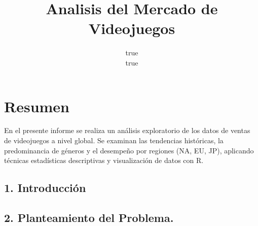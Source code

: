 \documentclass[oneside,11pt]{Latex/Classes/PhDthesisPSnPDF}
\title{Analisis del Mercado de Videojuegos}
\author{true \\ true}
\begin{document}
\maketitle

\frontmatter


\setcounter{secnumdepth}{3}
\setcounter{tocdepth}{3}

\tableofcontents



\cleardoublepage

  \cleardoublepage       %
  \chapter*{Resumen}     %
  
  En el presente informe se realiza un análisis exploratorio de los
datos de ventas de videojuegos a nivel global. Se examinan las
tendencias históricas, la predominancia de géneros y el desempeño por
regiones (NA, EU, JP), aplicando técnicas estadísticas descriptivas y
visualización de datos con
R.             %
  
  \cleardoublepage

\mainmatter
\def\baselinestretch{1.5}

\providecommand{\tightlist}{%
  \setlength{\itemsep}{0pt}\setlength{\parskip}{0pt}}

\newpage

\section{1. Introducción}\label{introducciuxf3n}

\section{2. Planteamiento del
Problema.}\label{planteamiento-del-problema.}
\end{document}
